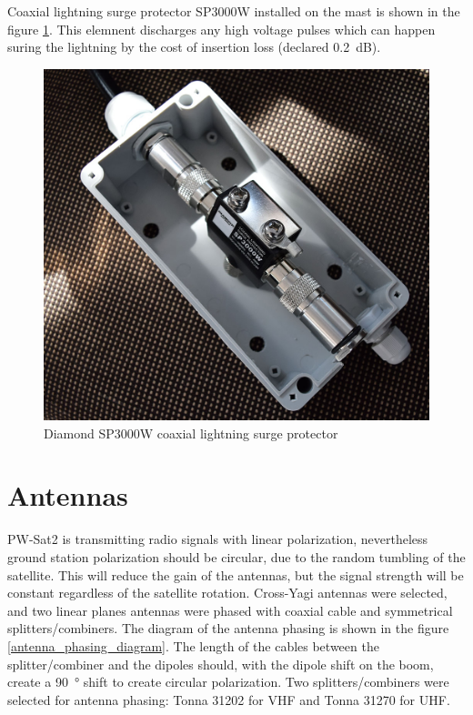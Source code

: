 Coaxial lightning surge protector SP3000W installed on the mast is shown in the figure \ref{coax_surge_protection}. This elemnent discharges any high voltage pulses which can happen suring the lightning by the cost of insertion loss (declared \SI{0.2}{\dB}).

\begin{figure}
    \centering
    \includegraphics[width=0.5\paperwidth]{img/5/coax_surge_protection.jpg}
    \caption{Diamond SP3000W coaxial lightning surge protector}
    \label{coax_surge_protection}
\end{figure}



\section{Antennas}
PW-Sat2 is transmitting radio signals with linear polarization, nevertheless ground station  polarization should be circular, due to the random tumbling of the satellite. This will reduce the gain of the antennas, but the signal strength will be constant regardless of the satellite rotation. Cross-Yagi antennas were selected, and two linear planes antennas were phased with coaxial cable and symmetrical splitters/combiners. The diagram of the antenna phasing is shown in the figure \ref{antenna_phasing_diagram}. The length of the cables between the splitter/combiner and the dipoles should, with the dipole shift on the boom, create a \SI{90}{\degree} shift to create circular polarization. Two splitters/combiners were selected for antenna phasing: Tonna 31202 for VHF and Tonna 31270 for UHF.

